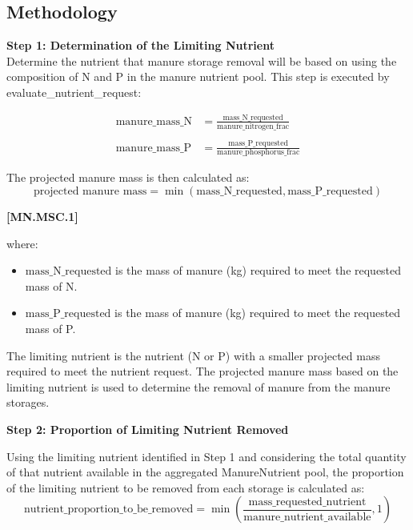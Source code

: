 \begin{refsection}
\subsection{Methodology}
\textbf{Step 1: Determination of the Limiting Nutrient}
\\
Determine the nutrient that manure storage removal will be based on using the composition of N and P in the manure nutrient pool. This step is executed by evaluate\_nutrient\_request:

\begin{align}
\text{manure\_mass\_N} &= \frac{\text{mass\_N\_requested}}{\text{manure\_nitrogen\_frac}} \\
\\
\text{manure\_mass\_P} &= \frac{\text{mass\_P\_requested}}{\text{manure\_phosphorus\_frac}}
\end{align}

The projected manure mass is then calculated as:
\begin{equation}
\text{projected manure mass} = \min\left( \text{mass\_N\_requested}, \text{mass\_P\_requested} \right)
\end{equation}
\vspace{0.5cm} 
    
    {\raggedleft \textbf{[MN.MSC.1]}\par}
    \vspace{0.5cm}

where:
\begin{itemize}
\item $\text{mass\_N\_requested}$ is the mass of manure (kg) required to meet the requested mass of N.
\item $\text{mass\_P\_requested}$ is the mass of manure (kg) required to meet the requested mass of P.
\end{itemize}

The limiting nutrient is the nutrient (N or P) with a smaller projected mass required to meet the nutrient request. The projected manure mass based on the limiting nutrient is used to determine the removal of manure from the manure storages.

\vspace{0.2cm}
\textbf{Step 2: Proportion of Limiting Nutrient Removed}

Using the limiting nutrient identified in Step 1 and considering the total quantity of that nutrient available in the aggregated ManureNutrient pool, the proportion of the limiting nutrient to be removed from each storage is calculated as:
\begin{equation}
\text{nutrient\_proportion\_to\_be\_removed} =
\min\left(
\frac{\text{mass\_requested\_nutrient}}{\text{manure\_nutrient\_available}},
1
\right)
\end{equation}
\vspace{0.5cm} 
    

\end{refsection}
